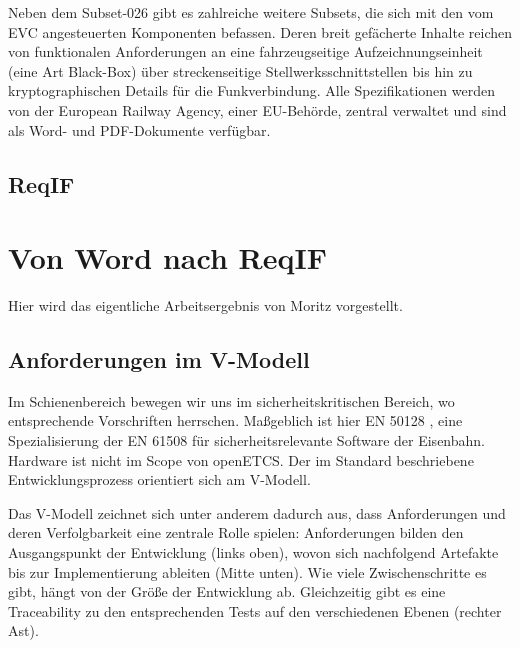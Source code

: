 \documentclass[twoside]{article}
\begin{document}
\begin{multicols}{2}
Neben dem \glqq{}Subset-026\grqq{} gibt es zahlreiche weitere Subsets, die sich mit den vom EVC angesteuerten Komponenten befassen. Deren breit gefächerte Inhalte reichen von funktionalen Anforderungen an eine fahrzeugseitige Aufzeichnungseinheit (eine Art \glqq Black-Box\grqq ) über streckenseitige Stellwerksschnittstellen bis hin zu kryptographischen Details für die Funkverbindung. Alle Spezifikationen werden von der European Railway Agency, einer EU-Behörde, zentral verwaltet und sind als Word- und PDF-Dokumente verfügbar.

\subsection{ReqIF}

\section{Von Word nach ReqIF}

Hier wird das eigentliche Arbeitsergebnis von Moritz vorgestellt.

\subsection{Anforderungen im V-Modell}

Im Schienenbereich bewegen wir uns im sicherheitskritischen Bereich, wo entsprechende Vorschriften herrschen.  Maßgeblich ist hier EN 50128 \cite{en50128}, eine Spezialisierung der EN 61508 für sicherheitsrelevante Software der Eisenbahn.  Hardware ist nicht im Scope von openETCS.  Der im Standard beschriebene Entwicklungsprozess orientiert sich am V-Modell.

Das V-Modell zeichnet sich unter anderem dadurch aus, dass Anforderungen und deren Verfolgbarkeit eine zentrale Rolle spielen: Anforderungen bilden den Ausgangspunkt der Entwicklung (\glqq{}links oben\grqq{}), wovon sich nachfolgend Artefakte bis zur Implementierung ableiten (\glqq{}Mitte unten\grqq{}). Wie viele Zwischenschritte es gibt, hängt von der Größe der Entwicklung ab.  Gleichzeitig gibt es eine Traceability zu den entsprechenden Tests auf den verschiedenen Ebenen (\glqq{}rechter Ast\grqq{}).




\end{multicols}
\end{document}
